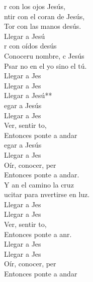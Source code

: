 \documentclass[12pt]{article}
\begin{document}
\begin{multicols*}{2}
\begin{cancion}%
	r con los ojos Jesús,\\
	ntir con el coran de Jesús,\\
	Tor con las manos desús.\\
	Llegar a Jesú   \\
	r con oídos desús \\
	Conoceru nombre, c Jesús\\
	Psar no en el yo sino el tú.\\
	Llegar a Jes \\
	Llegar a Jes\\
	Llegar a Jesú**\\
\jump
	egar a Jesús\\
	Llegar a Jes\\
	Ver, sentir to,    \\
	Entonces ponte a andar\\
	egar a Jesús\\
	Llegar a Jes\\
	Oír, conocer, per   \\
	Entonces ponte a andar.\\
	Y an el camino  la cruz\\
	ucitar para nvertirse en luz.\\
	Llegar a Jes \\
	Llegar a Jes\\
	Ver, sentir to,    \\
	Entonces ponte a anr.\\
	Llegar a Jes \\
	Llegar a Jes\\
	Oír, conocer, per   \\
	Entonces ponte a andar\\
\end{cancion}%


\end{multicols*}
\end{document}
